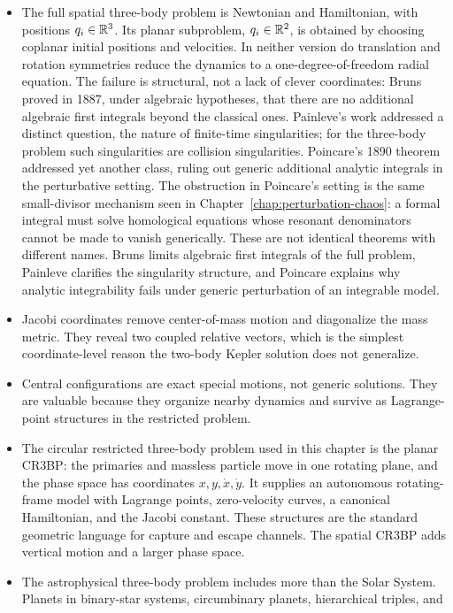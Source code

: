 \begin{itemize}
\item The full spatial three-body problem is Newtonian and Hamiltonian, with
positions \(q_i\in\mathbb{R}^3\).  Its planar subproblem, \(q_i\in\mathbb{R}^2\), is obtained
by choosing coplanar initial positions and velocities.  In neither version do
translation and rotation symmetries reduce the dynamics to a one-degree-of-freedom
radial equation.  The failure is structural, not a lack of clever
coordinates: Bruns proved in 1887, under algebraic hypotheses, that there are
no additional algebraic first integrals beyond the classical ones. Painleve's
work addressed a distinct question, the nature of finite-time singularities;
for the three-body problem such singularities are collision singularities.
Poincare's 1890 theorem addressed yet another class, ruling out generic
additional analytic integrals in the perturbative setting. The obstruction in
Poincare's setting is the same small-divisor mechanism seen in
Chapter~\ref{chap:perturbation-chaos}: a formal integral must solve
homological equations whose resonant denominators cannot be made to vanish
generically. These are not identical theorems with different names. Bruns
limits algebraic first integrals of the full problem, Painleve clarifies the
singularity structure, and Poincare explains why analytic integrability fails
under generic perturbation of an integrable model.
\item Jacobi coordinates remove center-of-mass motion and diagonalize the mass
metric.  They reveal two coupled relative vectors, which is the simplest
coordinate-level reason the two-body Kepler solution does not generalize.
\item Central configurations are exact special motions, not generic solutions.
They are valuable because they organize nearby dynamics and survive as
Lagrange-point structures in the restricted problem.
\item The circular restricted three-body problem used in this chapter is the
planar CR3BP: the primaries and massless particle move in one rotating plane,
and the phase space has coordinates \(x,y,\dot x,\dot y\).  It supplies an
autonomous rotating-frame model with Lagrange points, zero-velocity curves, a
canonical Hamiltonian, and the Jacobi constant. These structures are the
standard geometric language for capture and escape channels. The spatial CR3BP
adds vertical motion and a larger phase space.
\item The astrophysical three-body problem includes more than the Solar System.
Planets in binary-star systems, circumbinary planets, hierarchical triples, and

\end{itemize}
